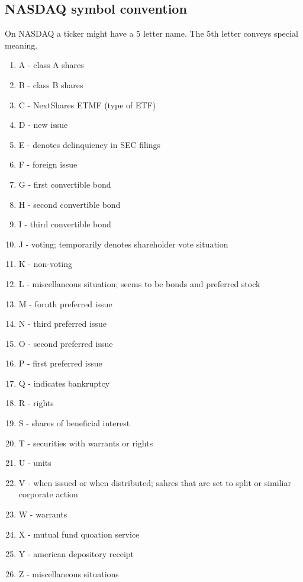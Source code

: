 \documentclass[8pt,oneside]{book}
\begin{document}
\subsection{NASDAQ symbol convention}\label{nasdaq_conv}

On NASDAQ a ticker might have a 5 letter name. The 5th letter conveys special meaning.

\begin{enumerate}
    \item A - class A shares
    \item B - class B shares
    \item C - NextShares ETMF (type of ETF)
    \item D - new issue
    \item E - denotes delinquiency in SEC filings
    \item F - foreign issue
    \item G - first convertible bond
    \item H - second convertible bond
    \item I - third convertible bond
    \item J - voting; temporarily denotes shareholder vote situation
    \item K - non-voting
    \item L - miscellaneous situation; seems to be bonds and preferred stock
    \item M - foruth preferred issue
    \item N - third preferred issue
    \item O - second preferred issue
    \item P - first preferred issue
    \item Q - indicates bankruptcy
    \item R - rights
    \item S - shares of beneficial interest
    \item T - securities with warrants or rights
    \item U - units
    \item V - when issued or when distributed; sahres that are set to split or similiar corporate action
    \item W - warrants
    \item X - mutual fund quoation service
    \item Y - american depository receipt
    \item Z - miscellaneous situations
\end{enumerate}
\end{document}
